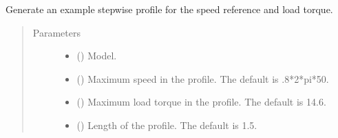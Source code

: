 \documentclass[letterpaper,10pt,english]{sphinxmanual}
\begin{document}
\begin{fulllineitems}
\label{\detokenize{helpers:helpers.ref_step}}
\pysigstartsignatures
{}
\pysigstopsignatures
\sphinxAtStartPar
Generate an example stepwise profile for the speed reference and load
torque.
\begin{quote}\begin{description}
\item[{Parameters}] \leavevmode\begin{itemize}
\item {} 
\sphinxAtStartPar
{} () \textendash{} Model.

\item {} 
\sphinxAtStartPar
{} (\sphinxstyleliteralemphasis{\sphinxupquote{, }}) \textendash{} Maximum speed in the profile. The default is .8*2*pi*50.

\item {} 
\sphinxAtStartPar
{} (\sphinxstyleliteralemphasis{\sphinxupquote{, }}) \textendash{} Maximum load torque in the profile. The default is 14.6.

\item {} 
\sphinxAtStartPar
{} (\sphinxstyleliteralemphasis{\sphinxupquote{, }}) \textendash{} Length of the profile. The default is 1.5.

\end{itemize}

\end{description}\end{quote}

\end{fulllineitems}


\sphinxstepscope
\end{document}
